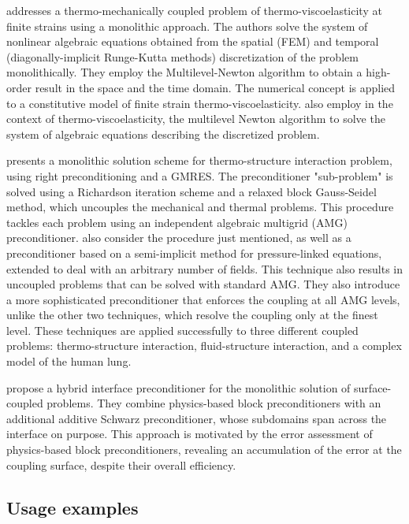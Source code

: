 \cite{netz_high-order_2013} addresses a thermo-mechanically coupled problem of thermo-viscoelasticity at finite strains using a monolithic approach.
The authors solve the system of nonlinear algebraic equations obtained from the spatial (FEM) and temporal (diagonally-implicit Runge-Kutta methods) discretization of the problem monolithically.
They employ the Multilevel-Newton algorithm to obtain a high-order result in the space and the time domain.
The numerical concept is applied to a constitutive model of finite strain thermo-viscoelasticity.
\cite{rothe_monolithic_2015} also employ in the context of thermo-viscoelasticity, the multilevel Newton algorithm to solve the system of algebraic equations describing the discretized problem.

\cite{danowski_monolithic_2013} presents a monolithic solution scheme for thermo-structure interaction problem, using right preconditioning and a GMRES.
The preconditioner "sub-problem" is solved using a Richardson iteration scheme and a relaxed block Gauss-Seidel method, which uncouples the mechanical and thermal problems.
This procedure tackles each problem using an independent algebraic multigrid (AMG) preconditioner.
\cite{verdugo_unified_2016} also consider the procedure just mentioned, as well as a preconditioner based on a semi-implicit method for pressure-linked equations, extended to deal with an arbitrary number of fields.
This technique also results in uncoupled problems that can be solved with standard AMG.
They also introduce a more sophisticated preconditioner that enforces the coupling at all AMG levels, unlike the other two techniques, which resolve the coupling only at the finest level.
These techniques are applied successfully to three different coupled problems: thermo-structure interaction, fluid-structure interaction, and a complex model of the human lung.

\cite{mayr_hybrid_2020} propose a hybrid interface preconditioner for the monolithic solution of surface-coupled problems.
They combine physics-based block preconditioners with an additional additive Schwarz preconditioner, whose subdomains span across the interface on purpose.
This approach is motivated by the error assessment of physics-based block preconditioners, revealing an accumulation of the error at the coupling surface, despite their overall efficiency.

\newpage


\subsection{Usage examples}

